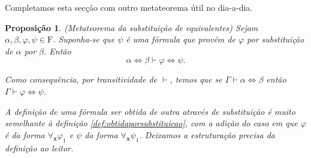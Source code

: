 \documentclass{report}
\newtheorem{prop}{Proposição}
\theoremstyle{definition}
\theoremstyle{remark}
\renewcommand{\bf}[1]{\mathbf{#1}}
\newcommand{\F}{\mathrm{F}}
\newcommand{\eqv}{\mathbin{\Leftrightarrow}}
\begin{document}
	Completamos esta secção com outro metateorema útil no dia-a-dia.

	\begin{prop} (Metateorema da substituição de equivalentes)
	Sejam $\alpha, \beta, \varphi, \psi \in \F$. Suponha-se que $\psi$ é uma fórmula que provém de $\varphi$ por substituição de $\alpha$ por $\beta$. Então
\[\alpha \eqv \beta \vdash \varphi \eqv \psi.\]

	Como consequência, por transitividade de $\vdash$, temos que se $\Gamma \vdash \alpha \eqv \beta$ então $\Gamma \vdash \varphi \eqv \psi$.

	A definição de uma fórmula ser obtida de outra através de substituição é muito semelhante à definição \ref{def:obtidaporsubstituicao}, com a adição do caso em que $\varphi$ é da forma $\forall_{\bf x} \varphi_1$ e $\psi$ da forma $\forall_{\bf x} \psi_1$. Deixamos a estruturação precisa da definição ao leitor.
	\end{prop}
\end{document}
